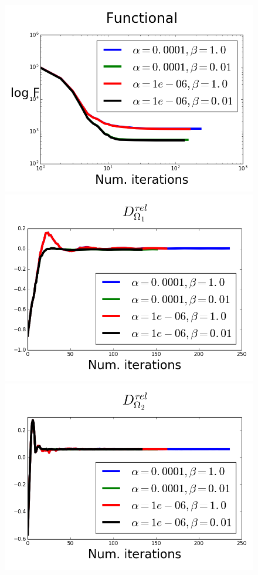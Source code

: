 \documentclass[11pt,a4paper]{article}
\begin{document}
\begin{figure}
\centering
\includegraphics[scale=0.2]{Convergence0}  
\includegraphics[scale=0.2]{Convergence1}  
\includegraphics[scale=0.2]{Convergence2}  

\end{figure}
\end{document}

